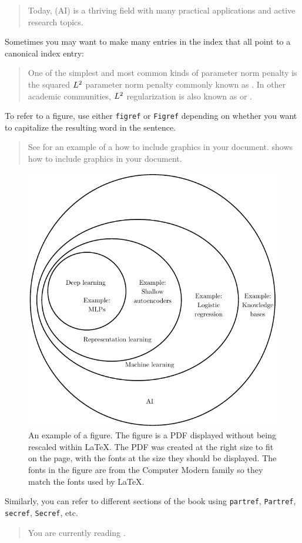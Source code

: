 \begin{quote}
Today,  (AI) is
a thriving field with many practical applications and active research topics.
\end{quote}

Sometimes you may want to make many entries in the index that all point
to a canonical index entry:

\begin{quote}
One of the simplest
and most common kinds of parameter norm penalty is
the squared $L^2$ parameter norm penalty
commonly known as .
In other academic communities,
$L^2$ regularization is also known as 
or .
\end{quote}

To refer to a figure, use either {\tt figref} or {\tt Figref} depending on
whether you want to capitalize the resulting word in the sentence.

\begin{quote}
See  for an example of a how to include graphics
in your document.
 shows how to include graphics in your document.
\end{quote}


\begin{figure}[t!]
\centering
\includegraphics{venn}
\caption{An example of a figure.
The figure is a PDF displayed without being rescaled within {\LaTeX}.
The PDF was created at the right size to fit on the page, with the
fonts at the size they should be displayed. The fonts in the figure
are from the Computer Modern family so they match the fonts used
by \LaTeX.}
\label{fig:venn}
\end{figure}

Similarly, you can refer to different sections of the book using
{\tt partref}, {\tt Partref}, {\tt secref}, {\tt Secref}, etc.

\begin{quote}
	You are currently reading .
\end{quote}

\clearpage
